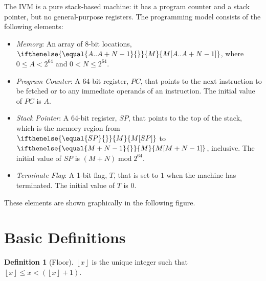 \documentclass[a4paper,10pt]{article}
\newcommand{\MEM}[1]{\ifthenelse{\equal{#1}{}}{M}{M[#1]}}
\newcommand{\PC}{PC}
\newcommand{\SP}{SP}
\newcommand{\TERM}{T}
\DeclareMathOperator{\Mod}{mod}
\newcommand{\modulo}[2]{#1 \Mod #2}
\theoremstyle{definition}
\newtheorem{definition}{Definition}
\begin{document}
The IVM is a pure stack-based machine: it has a program counter and a stack pointer, but no general-purpose registers.
The programming model consists of the following elements:
\begin{itemize}
\item \emph{Memory}:
  An array of 8-bit locations, $\MEM{A..A+N-1}$, where $0 \le A < 2^{64}$ and $0 < N \le 2^{64}$.
\item \emph{Program Counter}:
  A 64-bit register, $\PC$, that points to the next instruction to be fetched or to any immediate operands of an instruction.
  The initial value of $\PC$ is $A$.
\item \emph{Stack Pointer}:
  A 64-bit register, $\SP$, that points to the top of the stack, which is the memory region from $\MEM{\SP}$ to $\MEM{M+N-1}$, inclusive.
  The initial value of $\SP$ is $\modulo{(M+N)}{2^{64}}$.
\item \emph{Terminate Flag}:
  A 1-bit flag, $\TERM$, that is set to $1$ when the machine has terminated.
  The initial value of $\TERM$ is $0$.
\end{itemize}
These elements are shown graphically in the following figure.
\begin{trivlist}
\item\centering
\end{trivlist}

\section{Basic Definitions}
\label{sec:notation}

\begin{definition}[Floor]
  $\left \lfloor x \right \rfloor$ is the unique integer such that $\left \lfloor x \right \rfloor \le x < (\left \lfloor x \right \rfloor + 1)$.
\end{definition}
\end{document}

